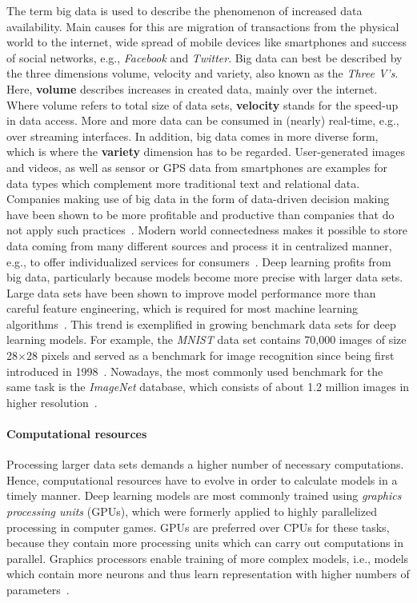 The term big data is used to describe the phenomenon of increased data
availability.
Main causes for this are migration of transactions from the physical world
to the internet, wide spread of mobile devices like smartphones and success
of social networks, e.g., \textit{Facebook} and \textit{Twitter}.
Big data can best be described by the three dimensions volume, velocity and
variety, also known as the \textit{Three V's}.
Here, \textbf{volume} describes increases in created data, mainly over the 
internet. 
Where volume refers to total size of data sets, \textbf{velocity} stands for the
speed-up in data access. More and more data can be consumed in (nearly) real-time,
e.g., over streaming interfaces.
In addition, big data comes in more diverse form, which is where the \textbf{variety}
dimension has to be regarded.
User-generated images and videos, as well as sensor or GPS data from smartphones
are examples for data types which complement more traditional text and relational
data.
Companies making use of big data in the form of data-driven decision making
have been shown to be more profitable and productive than companies that do not
apply such practices~\cite{McAfee2012}.
Modern world connectedness makes it possible to store data coming from
many different sources and process it in centralized manner, e.g., to offer
individualized services for consumers~\cite{Jordan2015}.
Deep learning profits from big data, particularly because models become more
precise with larger data sets.
Large data sets have been shown to improve model performance more than careful
feature engineering, which is required for most machine learning algorithms~\cite{Goodfellow2016}.
This trend is exemplified in growing benchmark data sets for deep learning
models.
For example, the \textit{MNIST} data set contains 70,000 images of size 28$\times$28 
pixels and served as a benchmark for image recognition since being first
introduced in 1998~\cite{LeCun1998}.
Nowadays, the most commonly used benchmark for the same task is the \textit{ImageNet}
database, which consists of about 1.2 million images in higher 
resolution~\cite{Russakovsky2015}.

\paragraph{Computational resources}

Processing larger data sets demands a higher number of necessary computations.
Hence, computational resources have to evolve in order to calculate models
in a timely manner.
Deep learning models are most commonly trained using \textit{graphics processing
units} (GPUs), which were formerly applied to highly parallelized processing
in computer games.
GPUs are preferred over CPUs for these tasks, because they contain more
processing units which can carry out computations in parallel.
Graphics processors enable training of more complex models, i.e., models which
contain more neurons and thus learn representation with higher numbers of 
parameters~\cite{Goodfellow2016, Raina2009}.

